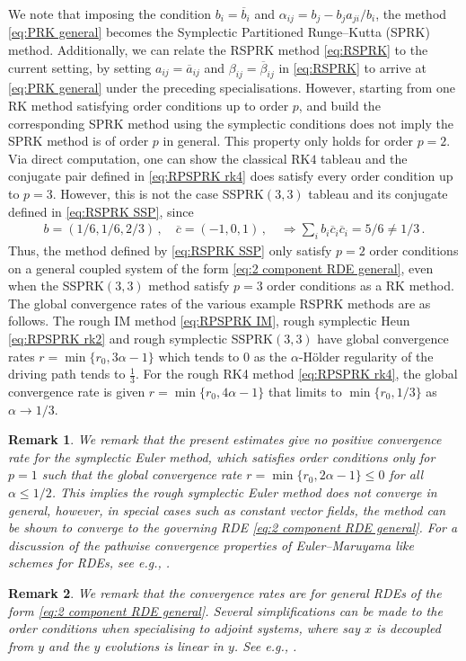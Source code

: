 \documentclass[11pt, oneside]{article}
\numberwithin{equation}{section}
\newtheorem{remark}{Remark}[section]
\theoremstyle{definition}
\newcommand{\ob}[1]{\overline{#1}}
\begin{document}
We note that imposing the condition $b_i = \ob{b}_i$ and $\alpha_{ij} = b_j - b_j a_{ji}/b_i$, the method \eqref{eq:PRK general} becomes the Symplectic Partitioned Runge--Kutta (SPRK) method. Additionally, we can relate the RSPRK method \eqref{eq:RSPRK} to the current setting, by setting $a_{ij} = \ob{a}_{ij}$ and $\beta_{ij} = \ob{\beta}_{ij}$ in \eqref{eq:RSPRK} to arrive at \eqref{eq:PRK general} under the preceding specialisations. However, starting from one RK method satisfying order conditions up to order $p$, and build the corresponding SPRK method using the symplectic conditions does not imply the SPRK method is of order $p$ in general. This property only holds for order $p=2$. 
Via direct computation, one can show the classical RK$4$ tableau and the conjugate pair defined in \eqref{eq:RPSPRK rk4} does satisfy every order condition up to $p=3$. However, this is not the case SSPRK$(3,3)$ tableau and its conjugate defined in \eqref{eq:RSPRK SSP}, since 
\begin{align*}
    b = (1/6,1/6,2/3)\,,\quad \ob{c} = (-1,0,1)\,, \quad \Longrightarrow \sum_i b_i \ob c_i\ob c_i = 5/6 \neq 1/3\,.
\end{align*}
Thus, the method defined by \eqref{eq:RSPRK SSP} only satisfy $p=2$ order conditions on a general coupled system of the form \eqref{eq:2 component RDE general}, even when the SSPRK$(3,3)$ method satisfy $p=3$ order conditions as a RK method. 
The global convergence rates of the various example RSPRK methods are as follows. The rough IM method \eqref{eq:RPSPRK IM}, rough symplectic Heun \eqref{eq:RPSPRK rk2} and rough symplectic SSPRK$(3,3)$ have global convergence rates $r = \min\{r_0, 3\alpha-1\}$ which tends to $0$ as the $\alpha$-H\"older regularity of the driving path tends to $\frac{1}{3}$. 
For the rough RK4 method \eqref{eq:RPSPRK rk4}, the global convergence rate is given $r = \min\{r_0, 4\alpha-1\}$ that limits to $\min\{r_0,1/3\}$ as $\alpha \rightarrow 1/3$.
\begin{remark}
    We remark that the present estimates give no positive convergence rate for the symplectic Euler method, which satisfies order conditions only for $p=1$ such that the global convergence rate $r = \min\{r_0, 2\alpha-1\} \leq 0$ for all $\alpha \leq 1/2$. This implies the rough symplectic Euler method does not converge in general, however, in special cases such as constant vector fields, the method can be shown to converge to the governing RDE \eqref{eq:2 component RDE general}. For a discussion of the pathwise convergence properties of Euler--Maruyama like schemes for RDEs, see e.g., \cite{Allan2025}.
\end{remark}
\begin{remark}
    We remark that the convergence rates are for general RDEs of the form \eqref{eq:2 component RDE general}. Several simplifications can be made to the order conditions when specialising to adjoint systems, where say $x$ is decoupled from $y$ and the $y$ evolutions is linear in $y$. See e.g., \cite{Hager2000}.
\end{remark}
\end{document}
